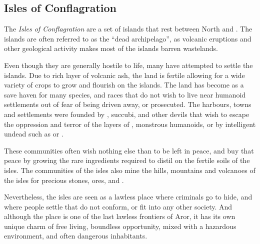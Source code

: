 \subsection{Isles of Conflagration}
\label{sec:Isles of Conflagration}

The \emph{Isles of Conflagration} are a set of islands that rest between North
 and . The islands are often
referred to as the ``dead archipelago'', as volcanic eruptions and other
geological activity makes most of the islands barren wastelands.

Even though they are generally hostile to life, many have attempted to settle
the islands. Due to rich layer of volcanic ash, the land is fertile allowing
for a wide variety of crops to grow and flourish on the islands. The land has
become as a save haven for many species, and races that do not wish to live
near humanoid settlements out of fear of being driven away, or prosecuted. The
harbours, towns and settlements were founded by ,
succubi, and other devils that wish to escape the oppression and terror of the
layers of , monstrous humanoids, or by intelligent undead
such as  or .

These communities often wish nothing else than to be left in peace, and buy that
peace by growing the rare ingredients required to distil 
on the fertile soils of the isles. The communities of the isles also mine the
hills, mountains and volcanoes of the isles for precious stones, ores, and
.

Nevertheless, the isles are seen as a lawless place where criminals go to
hide, and where people settle that do not conform, or fit into any other
society. And although the place is one of the last lawless frontiers of Aror,
it has its own unique charm of free living, boundless opportunity, mixed with
a hazardous environment, and often dangerous inhabitants.
